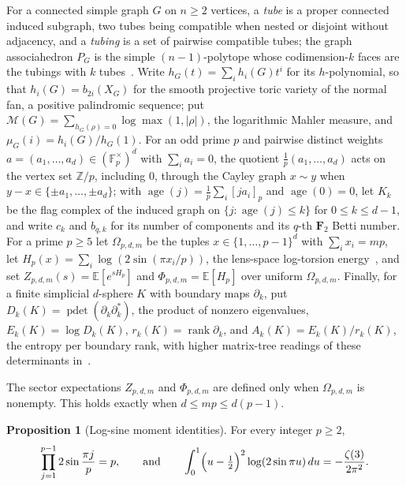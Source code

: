 \documentclass[11pt]{article}
\theoremstyle{definition}
\newcommand{\Z}{\mathbb Z}
\providecommand{\Z}{\mathbb Z}
\newtheorem{proposition}{Proposition}
\begin{document}
For a connected simple graph $G$ on $n\ge2$ vertices, a \emph{tube} is a proper connected induced subgraph, two tubes being compatible when nested or disjoint without adjacency, and a \emph{tubing} is a set of pairwise compatible tubes; the graph associahedron $P_G$ is the simple $(n-1)$-polytope whose codimension-$k$ faces are the tubings with $k$ tubes~\cite{PRW08}.  Write $h_G(t)=\sum_ih_i(G)t^i$ for its $h$-polynomial, so that $h_i(G)=b_{2i}(X_G)$ for the smooth projective toric variety of the normal fan, a positive palindromic sequence; put $\mathcal M(G)=\sum_{h_G(\rho)=0}\log\max(1,|\rho|)$, the logarithmic Mahler measure, and $\mu_G(i)=h_i(G)/h_G(1)$.  For an odd prime $p$ and pairwise distinct weights $a=(a_1,\ldots,a_d)\in(\mathbb F_p^\times)^d$ with $\sum_ia_i=0$, the quotient $\tfrac1p(a_1,\ldots,a_d)$ acts on the vertex set $\Z/p$, including $0$, through the Cayley graph $x\sim y$ when $y-x\in\{\pm a_1,\ldots,\pm a_d\}$; with $\operatorname{age}(j)=\tfrac1p\sum_i[ja_i]_p$ and $\operatorname{age}(0)=0$, let $K_k$ be the flag complex of the induced graph on $\{j:\operatorname{age}(j)\le k\}$ for $0\le k\le d-1$, and write $c_k$ and $b_{q,k}$ for its number of components and its $q$-th $\mathbf F_2$ Betti number.  For a prime $p\ge5$ let $\Omega_{p,d,m}$ be the tuples $x\in\{1,\ldots,p-1\}^d$ with $\sum_ix_i=mp$, let $H_p(x)=\sum_i\log(2\sin(\pi x_i/p))$, the lens-space log-torsion energy~\cite{NO92}, and set $Z_{p,d,m}(s)=\mathbb E[e^{sH_p}]$ and $\Phi_{p,d,m}=\mathbb E[H_p]$ over uniform $\Omega_{p,d,m}$.  Finally, for a finite simplicial $d$-sphere $K$ with boundary maps $\partial_k$, put $D_k(K)=\operatorname{pdet}(\partial_k\partial_k^{*})$, the product of nonzero eigenvalues, $E_k(K)=\log D_k(K)$, $r_k(K)=\operatorname{rank}\partial_k$, and $A_k(K)=E_k(K)/r_k(K)$, the entropy per boundary rank, with higher matrix-tree readings of these determinants in~\cite{DKM09,MMRW15}.

The sector expectations $Z_{p,d,m}$ and $\Phi_{p,d,m}$ are defined only when $\Omega_{p,d,m}$ is nonempty.  This holds exactly when $d\le mp\le d(p-1)$.

\begin{proposition}[Log-sine moment identities]\label{z:logsine}
For every integer $p\ge2$,
\[
\prod_{j=1}^{p-1}2\sin\frac{\pi j}{p}=p,
\qquad\text{and}\qquad
\int_0^1\Bigl(u-\tfrac12\Bigr)^2\log(2\sin\pi u)\,du=-\frac{\zeta(3)}{2\pi^2}.
\]
\end{proposition}
\end{document}
